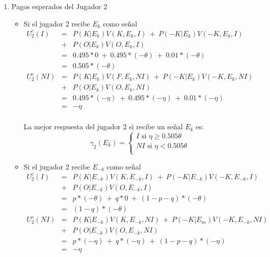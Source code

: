{\begin{enumerate}
\begin{enumerate}
\begin{enumerate}
            \item Pagos esperados del Jugador 2
            \begin{itemize}
                \item Si el jugador 2 recibe $E_k$ como señal
                \begin{eqnarray*}
                U_{2}^{e}(I)&=&P(K|E_k)V(K,E_k,I)\ +\ P(-K|E_k)V(-K,E_k,I)\\
                            &+&P(O|E_k)V(O,E_k,I)\\
                            &=&0.495*0\ +\ 0.495*(-\theta)\ + \ 0.01*(-\theta)\\
                            &=&0.505*(-\theta)\\
                U_{2}^{e}(NI)&=&P(K|E_k)V(F,E_k,NI)\ +\ P(-K|E_k)V(-K,E_k,NI)\\
                             &+&P(O|E_k)V(O,E_k,NI)\\
                             &=&0.495*(-\eta)\ +\ 0.495*(-\eta)\ + \ 0.01*(-\eta)\\
                             &=&-\eta\\
                \end{eqnarray*}

                La mejor respuesta del jugador 2 si recibe un señal $E_k$ es:
                \begin{equation*}
                \gamma_2(E_k)=
                \begin{cases}
                    I \text{ si } \eta \geq 0.505\theta \\
                    NI \text{ si } \eta < 0.505\theta \\
                \end{cases}    
                \end{equation*}
                
                \item Si el jugador 2 recibe $E_{-k}$ como señal
                \begin{eqnarray*}
                U_{2}^{e}(I)&=&P(K|E_{-k})V(K,E_{-k},I)\ +\ P(-K|E_{-k})V(-K,E_{-k},I)\\
                            &+&P(O|E_{-k})V(O,E_{-k},I)\\
                            &=&p*(-\theta)\ +\ q*0\ + \ (1-p-q)*(-\theta)\\
                            &=&(1-q)*(-\theta)\\
                U_{2}^{e}(NI)&=&P(K|E_{-k})V(K,E_{-k},NI)\ +\ P(-K|E_m)V(-K,E_{-k},NI)\\ 
                             &+&P(O|E_{-k})V(O,E_{-k},NI)\\
                             &=&p*(-\eta)\ +\ q*(-\eta)\ + \ (1-p-q)*(-\eta)\\
                             &=&-\eta\\
                \end{eqnarray*}


\end{itemize}
\end{enumerate}
\end{enumerate}
\end{enumerate}}
